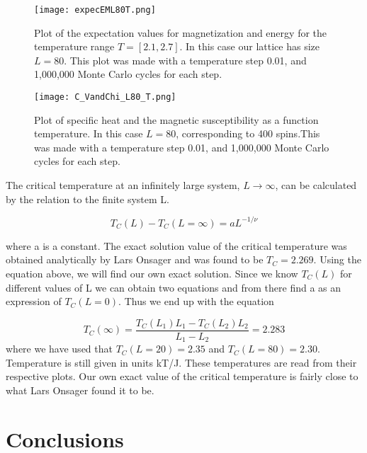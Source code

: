 \documentclass{aa}   %
\begin{document}
\begin{figure}
 \texttt{[image: expecEML80T.png]}
 \caption{Plot of the expectation values for magnetization and energy for the temperature range $T=[2.1,2.7]$. In this case our lattice has size $L=80$. This plot was made with a temperature step 0.01, and 1,000,000 Monte Carlo cycles for each step.}
\label{expecEML80T}
\end{figure}

\begin{figure}
 \texttt{[image: C\_VandChi\_L80\_T.png]}
 \caption{Plot of specific heat and the magnetic susceptibility as a function temperature. In this case $L=80$, corresponding to 400 spins.This was made with a temperature step 0.01, and 1,000,000 Monte Carlo cycles for each step.}
\label{C_VandChiL_80_T}
\end{figure}

The critical temperature at an infinitely large system, $L\rightarrow \infty$, can be calculated by the relation to the finite system L. 

\begin{equation}
T_C(L) - T_C(L=\infty) = aL^{-1/\nu}
\end{equation}

where a is a constant. The exact solution value of the critical temperature was obtained analytically by Lars Onsager and was found to be $T_C = 2.269$. Using the equation above, we will find our own exact solution. Since we know $T_C(L)$ for different values of L we can obtain two equations and from there find a as an expression of $T_C(L=0)$. Thus we end up with the equation 

\begin{equation}
 T_C(\infty) = \frac{T_C(L_1)L_1 - T_C(L_2)L_2}{L_1 - L_2} = 2.283
\end{equation}
where we have used that $T_C(L=20)= 2.35$ and $T_C(L=80) =2.30$. Temperature is still given in units kT/J. These temperatures are read from their respective plots.
Our own exact value of the critical temperature is fairly close to what Lars Onsager found it to be.


\section{Conclusions} \label{sec:conclusions}
\end{document}
